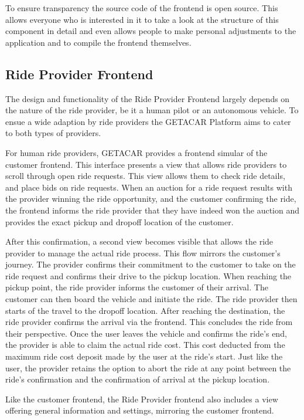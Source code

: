 To ensure transparency the source code of the frontend is open source. This allows everyone who is interested in it to take a look at the structure of this component in detail and even allows people to make personal adjustments to the application and to compile the frontend themselves.

\subsection{Ride Provider Frontend}\label{subsec:RideProviderFrontend}
The design and functionality of the Ride Provider Frontend largely depends on the nature of the ride provider, be it a human pilot or an autonomous vehicle. To ensue a wide adaption by ride providers the GETACAR Platform aims to cater to both types of providers.

For human ride providers, GETACAR provides a frontend simular of the customer frontend. This interface presents a view that allows ride providers to scroll through open ride requests. This view allows them to check ride details, and place bids on ride requests. When an auction for a ride request results with the provider winning the ride opportunity, and the customer confirming the ride, the frontend informs the ride provider that they have indeed won the auction and provides the exact pickup and dropoff location of the customer.

After this confirmation, a second view becomes visible that allows the ride provider to manage the actual ride process. This flow mirrors the customer's journey. The provider confirms their commitment to the customer to take on the ride request and confirms their drive to the pickup location. When reaching the pickup point, the ride provider informs the customer of their arrival. The customer can then board the vehicle and initiate the ride. The ride provider then starts of the travel to the dropoff location. After reaching the destination, the ride provider confirms the arrival via the frontend. This  concludes the ride from their perspective. Once the user leaves the vehicle and confirms the ride's end, the provider is able to claim the actual ride cost. This cost deducted from the maximum ride cost deposit made by the user at the ride's start. 
Just like the user, the provider retains the option to abort the ride at any point between the ride's confirmation and the confirmation of arrival at the pickup location.


Like the customer frontend, the Ride Provider frontend also includes a view offering general information and settings, mirroring the customer frontend.

